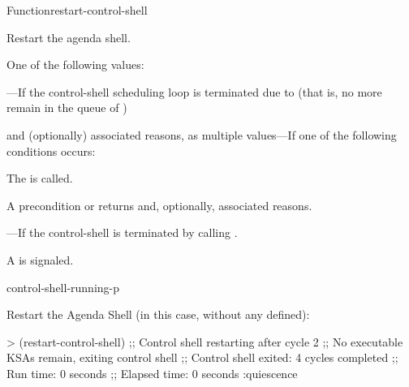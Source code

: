 \documentclass[10pt,twoside,english,pdftex]{article}
\begin{document}
\begin{functiondoc}{Function}{restart-control-shell}{\noargs
    \returns{} \superstar}
%
%
%

\fnsyntax

\fnpurpose Restart the agenda shell.

\fnpackage {}

\fnmodule {}

\fnreturns
One of the following values: 
\begin{tightitemize}
\item {}---If the control-shell scheduling loop is terminated
  due to  (that is, no more  remain 
  in the queue of ) 
\item {} and (optionally) associated reasons, as multiple
  values---If one of the following conditions occurs:
\begin{tightitemize}
\item The \textbf{}  is
  called.
\item A precondition  or  
  returns  and, optionally, associated reasons.
\end{tightitemize}
\item {}---If the control-shell is terminated by
  calling \textbf{}.
\end{tightitemize}

\fnevents
{}%
%
%
A  is signaled.
 
\begin{alsos}{control-shell-running-p}
\end{alsos}

\fnexample
Restart the Agenda Shell (in this case, without any  defined):
\begin{example}
> (restart-control-shell)
;; Control shell restarting after cycle 2
;; No executable KSAs remain, exiting control shell
;; Control shell exited: 4 cycles completed
;; Run time: 0 seconds
;; Elapsed time: 0 seconds
:quiescence
\end{example}

%
\fnnote \pollingnote

\end{functiondoc}
\end{document}
